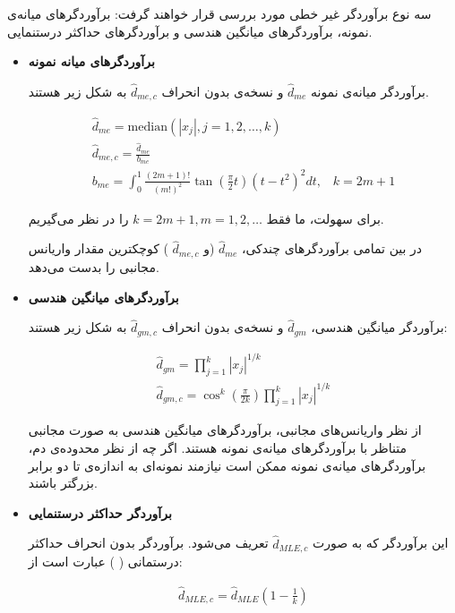 سه نوع برآوردگر غیر خطی مورد بررسی قرار خواهند گرفت: برآوردگرهای میانه‌ی نمونه، برآوردگرهای میانگین هندسی و برآوردگرهای حداکثر درستنمایی.

\begin{itemize}
\item
\textbf{
برآوردگرهای میانه نمونه
}

برآوردگر‌ میانه‌ی نمونه 
$\hat{d}_{me}$
و نسخه‌ی بدون انحراف 
$\hat{d}_{me,c}$
به شکل زیر هستند.

\begin{align}
\hat{d}_{me} = \mathrm{median} \left( \left| x_j \right|, j=1,2, \ldots, k \right)\\
\hat{d}_{me,c} = \frac{\hat{d}_{me}}{b_{me}}\\
b_{me} = \int_0^1 \frac{(2m+1)!}{(m!)^2} \tan \left( \frac{\pi}{2} t \right) \left( t - t^2 \right)^2 dt, \;\;\; k = 2m+1
\label{eq:1iT}
\end{align}

برای سهولت، ما فقط 
$k = 2m+1, m = 1,2, \ldots$
را در نظر می‌گیریم.

در بین تمامی برآوردگرهای چندکی، 
$\hat{d}_{me}$
(و 
$\hat{d}_{me,c}$
) کوچکترین مقدار واریانس مجانبی را بدست می‌دهد.

\item
\textbf{
برآوردگرهای میانگین هندسی
}

برآوردگر میانگین هندسی، 
$\hat{d}_{gm}$
و نسخه‌ی بدون انحراف 
$\hat{d}_{gm,c}$
به شکل زیر هستند:

\begin{align}
\hat{d}_{gm} = \prod_{j=1}^k \left| x_j \right|^{1/k}\\
\hat{d}_{gm,c} = \cos^k \left( \frac{\pi}{2k} \right) \prod_{j=1}^k \left| x_j \right|^{1/k}
\label{eq:1iU.0}
\end{align}

از نظر واریانس‌های مجانبی، برآوردگرهای میانگین هندسی به صورت مجانبی متناظر با برآوردگرهای میانه‌ی نمونه هستند. اگر چه از نظر محدوده‌ی دم، برآوردگرهای میانه‌ی نمونه ممکن است نیازمند نمونه‌ای به اندازه‌ی تا دو برابر بزرگتر باشند.

\item
\textbf{
برآوردگر حداکثر درستنمایی
}

این برآوردگر که به صورت 
$\hat{d}_{MLE,c}$
تعریف می‌شود. برآوردگر بدون انحراف حداکثر درستمانی (
) عبارت است از:

\begin{align}
\hat{d}_{MLE,c} = \hat{d}_{MLE} \left( 1 - \frac{1}{k} \right)
\label{eq:1iU.1}
\end{align}


\end{itemize}
